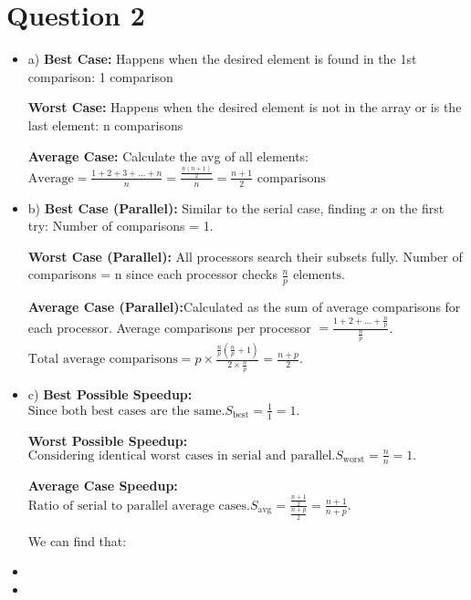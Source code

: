 \documentclass{article}
\begin{document}
\section{Question 2}
\begin{itemize}

\item a) \textbf{Best Case:} Happens when the desired element is found in the 1st comparison: 1 comparison \par
\textbf{Worst Case:} Happens when the desired element is not in the array or is the last element: n comparisons\par
\textbf{Average Case:} Calculate the avg of all elements: $\text{Average} = \frac{1 + 2 + 3 + \ldots + n}{n} = \frac{\frac{n(n + 1)}{2}}{n} = \frac{n + 1}{2} \text{ comparisons}$
\item b) \textbf{Best Case (Parallel):} Similar to the serial case, finding $x$ on the first try: Number of comparisons = 1.\par

\textbf{Worst Case (Parallel):} All processors search their subsets fully. Number of comparisons = n since each processor checks $\frac{n}{p} \text{ elements}$.\par

\textbf{Average Case (Parallel):}Calculated as the sum of average comparisons for each processor.
Average comparisons per processor $= \frac{1 + 2 + \ldots + \frac{n}{p}}{\frac{n}{p}}$.
$\text{Total average comparisons} = p \times \frac{\frac{n}{p}(\frac{n}{p} + 1)}{2 \times \frac{n}{p}} = \frac{n + p}{2}.$
\item c) \textbf{Best Possible Speedup:} $\text{Since both best cases are the same.}S_{\text{best}} = \frac{1}{1} = 1.$


\textbf{Worst Possible Speedup:} $\text{Considering identical worst cases in serial and parallel.}
S_{\text{worst}} = \frac{n}{n} = 1.$

\textbf{Average Case Speedup:} $\text{Ratio of serial to parallel average cases.}
S_{\text{avg}} = \frac{\frac{n + 1}{2}}{\frac{n + p}{2}} = \frac{n + 1}{n + p}.$\par

We can find that:
\item {}
\item {}
\end{itemize}
\end{document}
